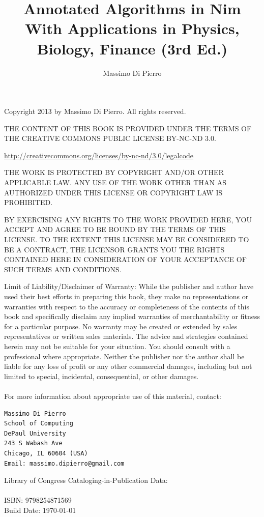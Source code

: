 \documentclass[justified, sixbynine]{tufte-book}
\title{\LARGE Annotated Algorithms in Nim\\[0.5em]
       \large With Applications in Physics, Biology, Finance (3rd Ed.)}
\author{Massimo Di Pierro}
\theoremstyle{plain}%
\newtheorem * {corollary}{Corollary}
\theoremstyle{definition}
\theoremstyle{remark}
\newtheorem * {remark}{Remark}
\newtheorem * {note}{Note}
\begin{document}
\frontmatter

\maketitle

\thispagestyle{empty}
\setlength{\parindent}{0pt}
\setlength{\parskip}{2mm}
{\footnotesize
\vskip 1in
Copyright 2013 by Massimo Di Pierro. All rights reserved.
\vskip 1cm

THE CONTENT OF THIS BOOK IS PROVIDED UNDER THE TERMS OF THE CREATIVE COMMONS PUBLIC LICENSE BY-NC-ND 3.0.

\url{http://creativecommons.org/licenses/by-nc-nd/3.0/legalcode}

THE WORK IS PROTECTED BY COPYRIGHT AND/OR OTHER APPLICABLE LAW. ANY USE OF THE WORK OTHER THAN AS AUTHORIZED UNDER THIS LICENSE OR COPYRIGHT LAW IS PROHIBITED.

BY EXERCISING ANY RIGHTS TO THE WORK PROVIDED HERE, YOU ACCEPT AND AGREE TO BE BOUND BY THE TERMS OF THIS LICENSE. TO THE EXTENT THIS LICENSE MAY BE CONSIDERED TO BE A CONTRACT, THE LICENSOR GRANTS YOU THE RIGHTS CONTAINED HERE IN CONSIDERATION OF YOUR ACCEPTANCE OF SUCH TERMS AND CONDITIONS.

Limit of Liability/Disclaimer of Warranty: While the publisher and
author have used their best efforts in preparing this book, they
make no representations or warranties with respect to the accuracy
or completeness of the contents of this book and specifically
disclaim any implied warranties of merchantability or fitness for a
particular purpose.  No warranty may be created or extended by
sales representatives or written sales materials.
The advice and strategies contained herein may not be
suitable for your situation. You should consult with a professional
where appropriate.  Neither the publisher nor the author shall be liable
for any loss of profit or any other commercial damages, including
but not limited to special, incidental, consequential, or other damages. \\ \\

For more information about appropriate use of this material, contact:

\begin{verbatim}
Massimo Di Pierro
School of Computing
DePaul University
243 S Wabash Ave
Chicago, IL 60604 (USA)
Email: massimo.dipierro@gmail.com
\end{verbatim}

Library of Congress Cataloging-in-Publication Data: \\ \\
ISBN: 9798254871569 \\
Build Date: \today
}
\end{document}

